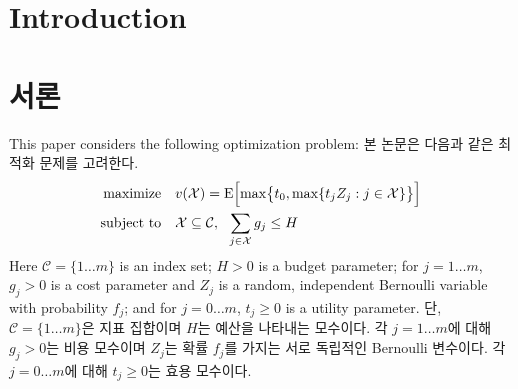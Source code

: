 \documentclass[11pt]{article} %
\theoremstyle{definition}
\newtheorem{definition}{Definition}
\theoremstyle{definition}
\newtheorem{definition}{정의}
\begin{document}
\pagebreak

\tableofcontents



\pagebreak
\ifen \section{Introduction}  \else \section{서론} \fi
\ifen This paper considers the following optimization problem:
\else 본 논문은 다음과 같은 최적화 문제를 고려한다.\fi
\begin{align} \label{headlineproblem}
\begin{split}
\text{maximize}\quad & v(\mathcal{X}) =  \operatorname{E}\Bigl[\max\bigr\{t_0,
\max\{t_j Z_j : j \in \mathcal{X}\}\bigr\}\Bigr] \\
\text{subject to}\quad & \mathcal{X} \subseteq \mathcal{C}, ~~\sum_{j\in \mathcal{X}} g_j \leq H
\end{split}
\end{align}
\ifen Here $\mathcal{C} = \{ 1 \dots m\}$ is an index set; $H > 0$ is a budget parameter; for $j = 1 \dots m$, $g_j > 0$ is a cost parameter and $Z_j$ is a random, independent Bernoulli variable with probability $f_j$; and for $j = 0\dots m$, $t_j\geq 0$ is a utility parameter. 
\else 단,  $\mathcal{C} = \{ 1 \dots m\}$은 지표 집합이며 $H$는 예산을 나타내는 모수이다. 각 $j = 1 \dots m$에 대해 $g_j > 0$는 비용 모수이며 $Z_j$는 확률 $f_j$를 가지는 서로 독립적인 Bernoulli 변수이다. 각 $j = 0 \dots m$에 대해 $t_j\geq 0$는 효용 모수이다. \fi
\end{document}
